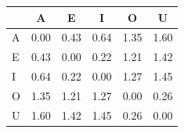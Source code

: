 \begin{tabular}{lccccc}
\toprule
\rowcolor{col01}
 & A & E & I & O & U \\
\midrule
A & 0.00 & 0.43 & 0.64 & 1.35 & 1.60 \\
E & 0.43 & 0.00 & 0.22 & 1.21 & 1.42 \\
I & 0.64 & 0.22 & 0.00 & 1.27 & 1.45 \\
O & 1.35 & 1.21 & 1.27 & 0.00 & 0.26 \\
U & 1.60 & 1.42 & 1.45 & 0.26 & 0.00 \\
\bottomrule
\end{tabular}
